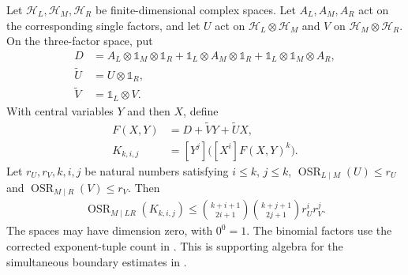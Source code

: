 \begin{theorem}
    \label{thm:tripartite_polynomial_coefficient_rank}
    \leanok
    Let $\mathcal H_L,\mathcal H_M,\mathcal H_R$ be finite-dimensional complex
    spaces. Let $A_L,A_M,A_R$ act on the corresponding single factors, and
    let $U$ act on $\mathcal H_L\otimes\mathcal H_M$ and $V$ on
    $\mathcal H_M\otimes\mathcal H_R$. On the three-factor space, put
    \begin{align*}
        D&=A_L\otimes\mathbb 1_M\otimes\mathbb 1_R
            +\mathbb 1_L\otimes A_M\otimes\mathbb 1_R
            +\mathbb 1_L\otimes\mathbb 1_M\otimes A_R, \\
        \widetilde U&=U\otimes\mathbb 1_R, \\
        \widetilde V&=\mathbb 1_L\otimes V.
    \end{align*}
    With central variables $Y$ and then $X$, define
    \begin{align*}
        F(X,Y)&=D+\widetilde VY+\widetilde UX, \\
        K_{k,i,j}&=[Y^j]\bigl([X^i]F(X,Y)^k\bigr).
    \end{align*}
    Let $r_U,r_V,k,i,j$ be natural numbers satisfying $i\le k$, $j\le k$,
    $\operatorname{OSR}_{L\mid M}(U)\le r_U$ and
    $\operatorname{OSR}_{M\mid R}(V)\le r_V$. Then
    \begin{align*}
        \operatorname{OSR}_{M\mid LR}(K_{k,i,j})
            \le\binom{k+i+1}{2i+1}\binom{k+j+1}{2j+1}r_U^i r_V^j.
    \end{align*}
    The spaces may have dimension zero, with $0^0=1$.
    The binomial factors use the corrected exponent-tuple count in
    \cite{gap:aklv13_interpolation_and_word_count}.
    This is supporting algebra for the simultaneous boundary estimates in
    \cite[Proposition~5.7]{Arad2016RigorousRG}.
\end{theorem}
